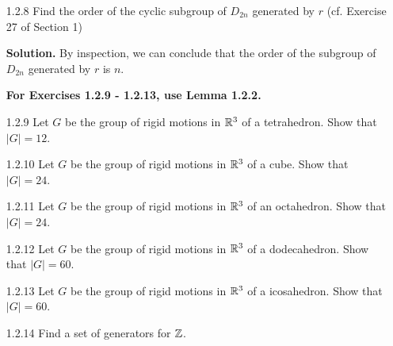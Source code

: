 \begin{enumerate}
      \textbf{Proof.} We already showed in Exercise 1.2.3 that $a$ and $b$
      generate $D_{2n}$, so first we want to show that the relations for $a$ and
      $b$ follow from that of $r$ and $s$. Since $s^2 = 1$ and since $a = s$, it
      follows that $a^2 = 1$. Also we have that $b^2 = (sr)^2 = 1$ by Exercise
      1.2.3. Now we have that $(ab)^n = (s(sr))^n = ((ss)r)^n = r^n = 1$.
      Conversely, we have that $s^2 = 1$ since $a^2 = 1$ and $s = a$. Also we
      have that $1 = (ab)^n = r^n$. Finally, since $1 = b^2 = srsr$, it follows 
      that $rsr = s^{-1} = s$, so that $rs = sr^{-1}$, as desired. \qed
   \item[1.2.8]   Find the order of the cyclic subgroup of $D_{2n}$ generated by
                  $r$ (cf. Exercise 27 of Section 1)
                  
      \textbf{Solution.} By inspection, we can conclude that the order of the
      subgroup of $D_{2n}$ generated by $r$ is $n$.
   \item[]        \textbf{For Exercises 1.2.9 - 1.2.13, use Lemma 1.2.2.}
   \item[1.2.9]   Let $G$ be the group of rigid motions in $\mathbb{R}^3$ of a
                  tetrahedron. Show that $|G| = 12$.
   \item[1.2.10]  Let $G$ be the group of rigid motions in $\mathbb{R}^3$ of a cube.
                  Show that $|G| = 24$.
   \item[1.2.11]  Let $G$ be the group of rigid motions in $\mathbb{R}^3$ of an
                  octahedron. Show that $|G| = 24$.
   \item[1.2.12]  Let $G$ be the group of rigid motions in $\mathbb{R}^3$ of a
                  dodecahedron. Show that $|G| = 60$.
   \item[1.2.13]  Let $G$ be the group of rigid motions in $\mathbb{R}^3$ of a
                  icosahedron. Show that $|G| = 60$.
   \item[1.2.14]  Find a set of generators for $\mathbb{Z}$.
   

\end{enumerate}
